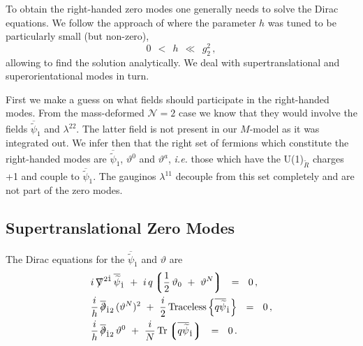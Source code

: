 \documentclass[12pt]{article}
\def\beq{\begin{equation}}
\def\eeq{\end{equation}}
\newcommand{\ntwo}{${\mathcal N}=2$ }
\newcommand{\p}{\partial}
\newcommand{\wt}{\widetilde}
\newcommand{\ov}{\overline}
\newcommand{\lgr}{\left\lgroup}
\newcommand{\rgr}{\right\rgroup}
\def\slashed#1{\setbox0=\hbox{$#1$}             %
   \dimen0=\wd0                                 %
   \setbox1=\hbox{/} \dimen1=\wd1               %
   \ifdim\dimen0>\dimen1                        %
      \rlap{\hbox to \dimen0{\hfil/\hfil}}      %
      #1                                        %
   \else                                        %
      \rlap{\hbox to \dimen1{\hfil$#1$\hfil}}   %
      /                                         %
   \fi}                                        %
\begin{document}
	To obtain the right-handed zero modes one generally needs to solve the Dirac equations.
	We follow the approach of \cite{GSYmmodel} where the parameter $ h $ was tuned to be particularly 
	small (but non-zero),
\beq
\label{smallh}
	0 ~~<~~ h ~~\ll~~ g_2^2\,,
\eeq
	allowing to find the solution analytically.
	We deal with supertranslational and superorientational modes in turn.

	First we make a guess on what fields should participate in the right-handed modes. 
	From the mass-deformed \ntwo case \cite{BSYhet} we know that they would involve
	the fields $ \ov{\wt{\psi}}{}_{\dot 1} $ and $ \lambda^{22} $.
	The latter field is not present in our $M$-model as it was integrated out.
	We infer then that the right set of fermions which constitute the right-handed modes
	are $ \ov{\wt{\psi}}{}_{\dot 1} $, $ \vartheta^0 $ and $ \vartheta^a $, {\it i.e.}
	those which have the U(1)$_{\wt R}$ charges +1 and couple to $ \ov{\wt{\psi}}{}_{\dot 1} $.
	The gauginos $ \lambda^{11} $ decouple from this set completely and are not part of the zero modes.

\subsection{Supertranslational Zero Modes}

	The Dirac equations for the $ \ov{\wt \psi}{}_{\dot 1} $ and $ \vartheta $ are
\begin{align*}
%
&
	i\, \slashed{\nabla}^{2\dot{1}}\, \ov{\wt\psi}{}_{\dot 1}  
		~+~  i\, q \lgr \frac{1}{2}\, \vartheta_0  ~+~ \vartheta^N \rgr ~~=~~ 0\,, \\
%
&
	\frac{i}{h}\, \ov{\slashed{\p}}{}_{\dot{1}2}\, (\vartheta^N)^2
		~+~ \frac{i}{2}\, {\rm Traceless} \left\{ \ov{q \wt{\psi}}{}_{\dot 1} \right\} ~~=~~ 0\,, \\
%
&
	\frac{i}{h}\, \ov{\slashed{\p}}_{\dot{1}2}\, \vartheta^0 
		~+~ \frac{i}{N}\, {\rm Tr} \lgr \ov{q \wt{\psi}}{}_{\dot 1} \rgr ~~=~~ 0\,.
\end{align*}
\end{document}
